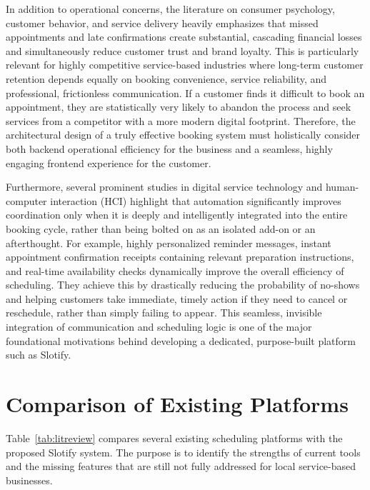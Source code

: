 In addition to operational concerns, the literature on consumer psychology, customer behavior, and service delivery heavily emphasizes that missed appointments and late confirmations create substantial, cascading financial losses and simultaneously reduce customer trust and brand loyalty. This is particularly relevant for highly competitive service-based industries where long-term customer retention depends equally on booking convenience, service reliability, and professional, frictionless communication. If a customer finds it difficult to book an appointment, they are statistically very likely to abandon the process and seek services from a competitor with a more modern digital footprint. Therefore, the architectural design of a truly effective booking system must holistically consider both backend operational efficiency for the business and a seamless, highly engaging frontend experience for the customer.

Furthermore, several prominent studies in digital service technology and human-computer interaction (HCI) highlight that automation significantly improves coordination only when it is deeply and intelligently integrated into the entire booking cycle, rather than being bolted on as an isolated add-on or an afterthought. For example, highly personalized reminder messages, instant appointment confirmation receipts containing relevant preparation instructions, and real-time availability checks dynamically improve the overall efficiency of scheduling. They achieve this by drastically reducing the probability of no-shows and helping customers take immediate, timely action if they need to cancel or reschedule, rather than simply failing to appear. This seamless, invisible integration of communication and scheduling logic is one of the major foundational motivations behind developing a dedicated, purpose-built platform such as Slotify.

\section{Comparison of Existing Platforms}
Table~\ref{tab:litreview} compares several existing scheduling platforms with the proposed Slotify system. The purpose is to identify the strengths of current tools and the missing features that are still not fully addressed for local service-based businesses.

